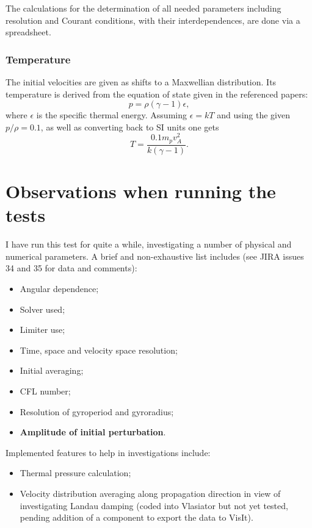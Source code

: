 \documentclass[a4paper,10pt]{scrartcl}
\begin{document}
The calculations for the determination of all needed parameters including resolution and Courant conditions, with their interdependences, are done via a spreadsheet.

\subsubsection*{Temperature}
The initial velocities are given as shifts to a Maxwellian distribution. Its temperature is derived from the equation of state given in the referenced papers:
\begin{equation}
 p = \rho \left(\gamma - 1\right) \epsilon,
\end{equation}
where $\epsilon$ is the specific thermal energy. Assuming $\epsilon = kT$ and using the given $p/\rho = 0.1$, as well as converting back to SI units one gets
\begin{equation}
 T = \frac{0.1 m_p v_A^2}{k \left(\gamma - 1\right)}.
 \label{eq:T}
\end{equation}


\section{Observations when running the tests}
I have run this test for quite a while, investigating a number of physical and numerical parameters. A brief and non-exhaustive list includes (see JIRA issues 34 and 35 for data and comments):
\begin{itemize}
 \item Angular dependence;
 \item Solver used;
 \item Limiter use;
 \item Time, space and velocity space resolution;
 \item Initial averaging;
 \item CFL number;
 \item Resolution of gyroperiod and gyroradius;
 \item \textbf{Amplitude of initial perturbation}.
\end{itemize}
Implemented features to help in investigations include:
\begin{itemize}
 \item Thermal pressure calculation;
 \item Velocity distribution averaging along propagation direction in view of investigating Landau damping (coded into Vlasiator but not yet tested, pending addition of a component to export the data to VisIt).
\end{itemize}
\end{document}
